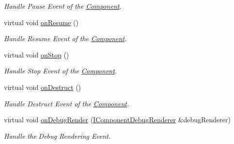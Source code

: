 \begin{DoxyCompactItemize}
\begin{DoxyCompactList}\small\item\em Handle Pause Event of the \hyperlink{class_magnum_1_1_component}{Component}. \end{DoxyCompactList}\item 
virtual void \hyperlink{class_magnum_1_1_component_1_1_owner_ad8287d45f72835b21a28710904d1d791}{on\+Resume} ()\hypertarget{class_magnum_1_1_component_1_1_owner_ad8287d45f72835b21a28710904d1d791}{}\label{class_magnum_1_1_component_1_1_owner_ad8287d45f72835b21a28710904d1d791}

\begin{DoxyCompactList}\small\item\em Handle Resume Event of the \hyperlink{class_magnum_1_1_component}{Component}. \end{DoxyCompactList}\item 
virtual void \hyperlink{class_magnum_1_1_component_1_1_owner_ae883328e19cdc0bc293dbb17ba870eb5}{on\+Stop} ()\hypertarget{class_magnum_1_1_component_1_1_owner_ae883328e19cdc0bc293dbb17ba870eb5}{}\label{class_magnum_1_1_component_1_1_owner_ae883328e19cdc0bc293dbb17ba870eb5}

\begin{DoxyCompactList}\small\item\em Handle Stop Event of the \hyperlink{class_magnum_1_1_component}{Component}. \end{DoxyCompactList}\item 
virtual void \hyperlink{class_magnum_1_1_component_1_1_owner_a143672a60295c38510e29f0f0b53b7f0}{on\+Destruct} ()\hypertarget{class_magnum_1_1_component_1_1_owner_a143672a60295c38510e29f0f0b53b7f0}{}\label{class_magnum_1_1_component_1_1_owner_a143672a60295c38510e29f0f0b53b7f0}

\begin{DoxyCompactList}\small\item\em Handle Destruct Event of the \hyperlink{class_magnum_1_1_component}{Component}. \end{DoxyCompactList}\item 
virtual void \hyperlink{class_magnum_1_1_component_1_1_owner_aae44f2e891f2cb1a1fd4e4fa59e37289}{on\+Debug\+Render} (\hyperlink{class_magnum_1_1_i_component_debug_renderer}{I\+Component\+Debug\+Renderer} \&debug\+Renderer)\hypertarget{class_magnum_1_1_component_1_1_owner_aae44f2e891f2cb1a1fd4e4fa59e37289}{}\label{class_magnum_1_1_component_1_1_owner_aae44f2e891f2cb1a1fd4e4fa59e37289}

\begin{DoxyCompactList}\small\item\em Handle the Debug Rendering Event. \end{DoxyCompactList}\end{DoxyCompactItemize}
